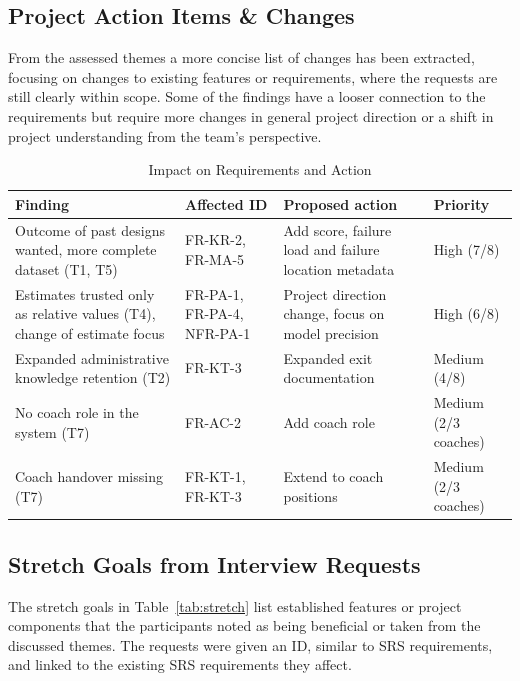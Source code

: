 \documentclass{article}
\newcommand{\rid}[1]{\mbox{#1}}
\begin{document}
\subsection{Project Action Items \& Changes}
\label{sec:impact}

From the assessed themes a more concise list of changes has been extracted, focusing on changes to existing features 
or requirements, where the requests are still clearly within scope. Some of the findings have a looser connection to the 
requirements but require more changes in general project direction or a shift in project understanding from the team's 
perspective.

\begin{table}[H]
\centering
\caption{Impact on Requirements and Action}
\label{tab:impact}
\small
\begin{tabularx}{\textwidth}{@{}Y L{2.5cm} L{3.2cm} L{1.4cm}@{}}
\toprule
\textbf{Finding} & \textbf{Affected ID} & \textbf{Proposed action} & \textbf{Priority} \\
\midrule
Outcome of past designs wanted, more complete dataset (T1, T5) & \rid{FR-KR-2}, \rid{FR-MA-5} & Add score, failure load and failure location metadata & High (7/8) \\
Estimates trusted only as relative values (T4), change of estimate focus & \rid{FR-PA-1}, \rid{FR-PA-4}, \rid{NFR-PA-1} & Project direction change, focus on model precision & High (6/8) \\
Expanded administrative knowledge retention (T2) & \rid{FR-KT-3} & Expanded exit documentation & Medium (4/8) \\
No coach role in the system (T7) & \rid{FR-AC-2} & Add coach role & Medium (2/3 coaches) \\
Coach handover missing (T7) & \rid{FR-KT-1}, \rid{FR-KT-3} & Extend to coach positions & Medium (2/3 coaches) \\
\bottomrule
\end{tabularx}
\end{table}

\subsection{Stretch Goals from Interview Requests}
\label{sec:stretch}

The stretch goals in Table~\ref{tab:stretch} list established features or project components 
that the participants noted as being beneficial or taken from the discussed themes. 
The requests were given an ID, similar to SRS requirements, and linked to the existing SRS requirements they affect.
\end{document}
